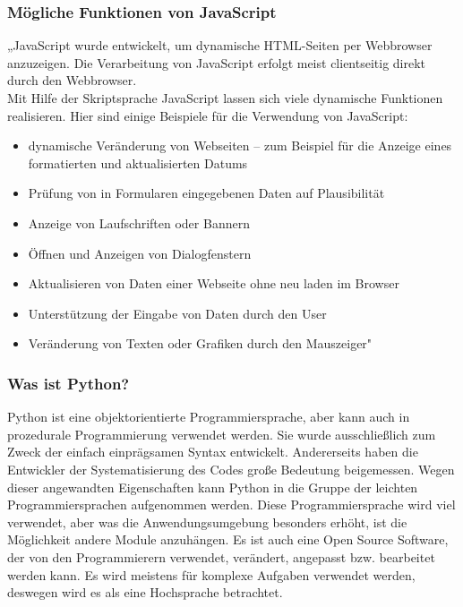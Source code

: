\subsubsection{Mögliche Funktionen von JavaScript} 
„JavaScript wurde entwickelt, um dynamische HTML-Seiten per Webbrowser anzuzeigen. Die Verarbeitung von JavaScript erfolgt meist clientseitig direkt durch den Webbrowser. \\
Mit Hilfe der Skriptsprache JavaScript lassen sich viele dynamische Funktionen realisieren. Hier sind einige Beispiele für die Verwendung von JavaScript:
\begin{itemize}
	\item  dynamische Veränderung von Webseiten – zum Beispiel für die Anzeige eines formatierten und aktualisierten Datums
\end{itemize}
\begin{itemize}
	\item Prüfung von in Formularen eingegebenen Daten auf Plausibilität
\end{itemize}
\begin{itemize}
	\item Anzeige von Laufschriften oder Bannern
\end{itemize}
\begin{itemize}
	\item 	Öffnen und Anzeigen von Dialogfenstern
\end{itemize}
\begin{itemize}
	\item Aktualisieren von Daten einer Webseite ohne neu laden im Browser
\end{itemize}
\begin{itemize}
	\item 	Unterstützung der Eingabe von Daten durch den User
\end{itemize}
\begin{itemize}
	\item Veränderung von Texten oder Grafiken durch den Mauszeiger" \cite{50_javascript}
\end{itemize}
\subsubsection{Was ist Python?} 
Python ist eine objektorientierte Programmiersprache, aber kann auch in prozedurale Programmierung verwendet werden. Sie wurde ausschließlich zum Zweck der einfach einprägsamen Syntax entwickelt. Andererseits haben die Entwickler der Systematisierung des Codes große Bedeutung beigemessen. Wegen dieser angewandten Eigenschaften kann Python in die Gruppe der leichten Programmiersprachen aufgenommen werden. Diese Programmiersprache wird viel verwendet, aber was die Anwendungsumgebung besonders erhöht, ist die Möglichkeit andere Module anzuhängen. Es ist auch eine Open Source Software, der von den Programmierern verwendet, verändert, angepasst bzw. bearbeitet werden kann. Es wird meistens für komplexe Aufgaben verwendet werden, deswegen wird es als eine Hochsprache betrachtet. \cite{50_python}
